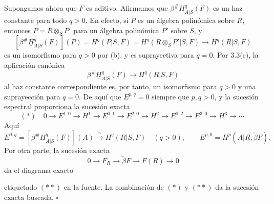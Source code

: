 Supongamos ahora que $F$ es aditivo. Afirmamos que
$\beta^{\#}\underline H^q_{A|S}(F)$ es un haz constante para todo
$q>0$. En efecto, si $P$ es un álgebra polinómica sobre $R$, entonces
$P=R\otimes_SP'$ para un álgebra polinómica $P'$ sobre $S$, y
\[
 [\beta^{\#}\underline H^q_{A|S}(F)](P)
 =H^q(P|S,F)
 =H^q(R\otimes_SP'|S,F)
 \longrightarrow H^q(R|S,F)
\]
es un isomorfismo para $q>0$ por (b), y es suprayectiva para $q=0$.
Por 3.3(c), la aplicación canónica
\[
 \beta^{\#}\underline H^q_{A|S}(F)
 \longrightarrow H^q(R|S,F)
\]
al haz constante correspondiente es, por tanto, un isomorfismo para
$q>0$ y una suprayección para $q=0$. De aquí que $E^{p,q}=0$ siempre que
$p,q>0$, y la sucesión espectral proporciona la sucesión exacta
\[
 (*)\quad
 0\longrightarrow E^{1,0}\longrightarrow H^1
 \longrightarrow E^{0,1}\longrightarrow E^{2,0}
 \longrightarrow H^2\longrightarrow E^{0,2}
 \longrightarrow E^{3,0}\longrightarrow H^3\longrightarrow\cdots.
\]
Aquí
\[
 E^{0,q}=[\beta^{\#}\underline H^q_{A|S}(F)](A)
 \xrightarrow{\ \sim\ }H^q(R|S,F)\quad(q>0),
 \qquad
 E^{p,0}=H^p(A|R,\widetilde\beta F).
\]
Por otra parte, la sucesión exacta
\[
 0\longrightarrow F_R\longrightarrow\widetilde\beta F
 \longrightarrow F(R)\longrightarrow0
\]
da el diagrama exacto
\begin{center}
\scriptsize
{}
\end{center}
etiquetado $(**)$ en la fuente. La combinación de $(*)$ y $(**)$ da la
sucesión exacta buscada. \hfill$\square$
